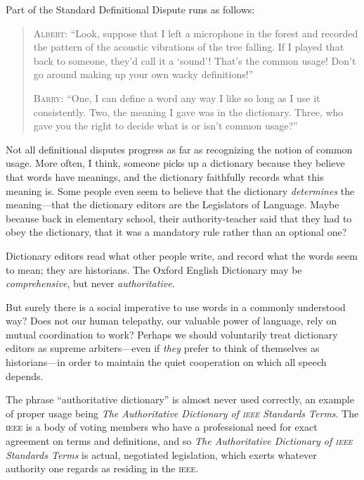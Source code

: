 { Part of the Standard Definitional Dispute runs as follows:

\begin{quotation}

 \textsc{Albert}: ``Look, suppose that I left a microphone
in the forest and recorded the pattern of the acoustic vibrations of
the tree falling. If I played that back to someone,
they'd call it a
`sound'! That's the
common usage! Don't go around making up your own wacky
definitions!''

{
 \textsc{Barry}: ``One, I can define a word any way I like
so long as I use it consistently. Two, the meaning I gave was in the
dictionary. Three, who gave you the right to decide what is or
isn't common usage?''}
\end{quotation}


 Not all definitional disputes progress as far as recognizing the
notion of common usage. More often, I think, someone picks up a
dictionary because they believe that words have meanings, and the
dictionary faithfully records what this meaning is. Some people even
seem to believe that the dictionary \textit{determines} the
meaning---that the dictionary editors are the Legislators of Language.
Maybe because back in elementary school, their authority-teacher said
that they had to obey the dictionary, that it was a mandatory rule
rather than an optional one?


 Dictionary editors read what other people write, and record what
the words seem to mean; they are historians. The Oxford English
Dictionary may be \textit{comprehensive}, but never
\textit{authoritative.}


 But surely there is a social imperative to use words in a commonly
understood way? Does not our human telepathy, our valuable power of
language, rely on mutual coordination to work? Perhaps we should
voluntarily treat dictionary editors as supreme arbiters---even if
\textit{they} prefer to think of themselves as historians---in order to
maintain the quiet cooperation on which all speech depends.


 The phrase ``authoritative
dictionary'' is almost never used correctly, an
example of proper usage being \textit{The Authoritative Dictionary of
\textsc{ieee} Standards Terms}. The \textsc{ieee} is a body of voting members who have a
professional need for exact agreement on terms and definitions, and so
\textit{The Authoritative Dictionary of \textsc{ieee} Standards Terms} is
actual, negotiated legislation, which exerts whatever authority one
regards as residing in the \textsc{ieee}.


}
